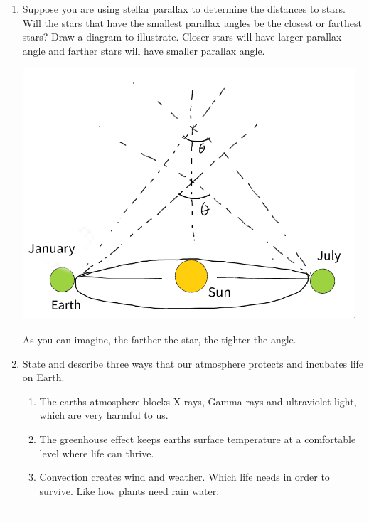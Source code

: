 \documentclass[12pt]{article}
\begin{document}
\begin{enumerate}
                \item Suppose you are using stellar parallax to determine the distances to stars. Will the stars that have the smallest parallax angles be the closest or farthest stars? Draw a diagram to illustrate.\newline
                    Closer stars will have larger parallax angle and farther stars will have smaller parallax angle.\newline\newline
                    \centerline{\includegraphics[scale=0.5]{illustration}\newline}
                    As you can imagine, the farther the star, the tighter the angle.

                \item State and describe three ways that our atmosphere protects and incubates life on Earth.
                    \begin{enumerate}
                        \item The earths atmosphere blocks X-rays, Gamma rays and ultraviolet light, which are very harmful to us.
                        \item The greenhouse effect keeps earths surface temperature at a comfortable level where life can thrive.
                        \item Convection creates wind and weather. Which life needs in order to survive. Like how plants need rain water. 
                    \end{enumerate}


        \end{enumerate}

————————————————
\end{document}
